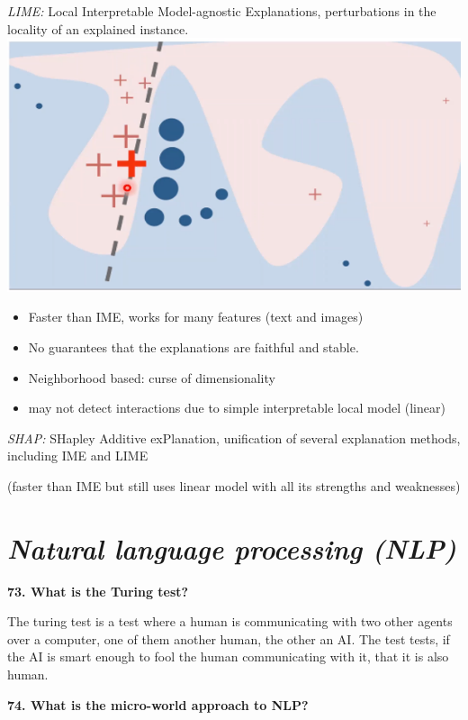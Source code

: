 \textit{LIME:} Local Interpretable Model-agnostic Explanations,
perturbations in the locality of an explained
instance.
\includegraphics[width=\columnwidth]{media/image25.png}

\begin{itemize}
\item Faster than IME, works for many features (text and images)
\item No guarantees that the explanations are faithful and stable.
\item Neighborhood based: curse of dimensionality
\item may not detect interactions due to simple interpretable local model (linear)
\end{itemize}

\textit{SHAP:} SHapley Additive exPlanation, unification of several
explanation methods, including IME and LIME

(faster than IME but still uses linear model with all its strengths and
weaknesses)

\hypertarget{natural-language-processing-nlp}{%
\section{\texorpdfstring{\textit{Natural language processing
(NLP)}}{Natural language processing (NLP)}}\label{natural-language-processing-nlp}}

\textbf{73. What is the Turing test?}

The turing test is a test where a human is communicating with two other
agents over a computer, one of them another human, the other an AI. The
test tests, if the AI is smart enough to fool the human communicating
with it, that it is also human.

\textbf{74. What is the micro-world approach to NLP?}

